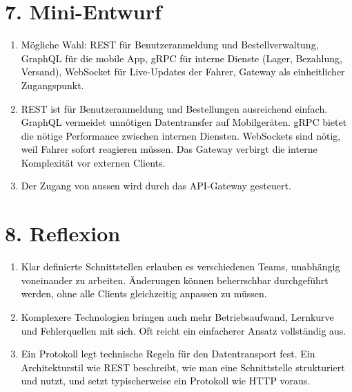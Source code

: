 \documentclass[11pt,a4paper]{article}
\newcommand{\solution}[1]{\textcolor{black}{#1}}
\begin{document}
\section*{7. Mini-Entwurf}
\begin{enumerate}
  \item \solution{Mögliche Wahl: REST für Benutzeranmeldung und Bestellverwaltung, GraphQL für die mobile App, gRPC für interne Dienste (Lager, Bezahlung, Versand), WebSocket für Live-Updates der Fahrer, Gateway als einheitlicher Zugangspunkt.}
  \item \solution{REST ist für Benutzeranmeldung und Bestellungen ausreichend einfach. GraphQL vermeidet unnötigen Datentransfer auf Mobilgeräten. gRPC bietet die nötige Performance zwischen internen Diensten. WebSockets sind nötig, weil Fahrer sofort reagieren müssen. Das Gateway verbirgt die interne Komplexität vor externen Clients.}
  \item \solution{Der Zugang von aussen wird durch das API-Gateway gesteuert.}
\end{enumerate}

\section*{8. Reflexion}
\begin{enumerate}
  \item \solution{Klar definierte Schnittstellen erlauben es verschiedenen Teams, unabhängig voneinander zu arbeiten. Änderungen können beherrschbar durchgeführt werden, ohne alle Clients gleichzeitig anpassen zu müssen.}
  \item \solution{Komplexere Technologien bringen auch mehr Betriebsaufwand, Lernkurve und Fehlerquellen mit sich. Oft reicht ein einfacherer Ansatz vollständig aus.}
  \item \solution{Ein Protokoll legt technische Regeln für den Datentransport fest. Ein Architekturstil wie REST beschreibt, wie man eine Schnittstelle strukturiert und nutzt, und setzt typischerweise ein Protokoll wie HTTP voraus.}
\end{enumerate}
\end{document}
